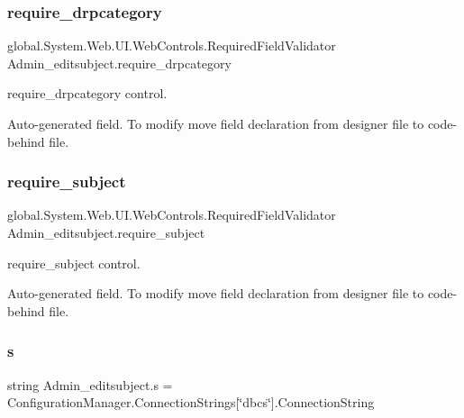 \subsubsection{\texorpdfstring{require\_drpcategory}{require\_drpcategory}}
{\footnotesize\ttfamily global.\+System.\+Web.\+U\+I.\+Web\+Controls.\+Required\+Field\+Validator Admin\+\_\+editsubject.\+require\+\_\+drpcategory\hspace{0.3cm}{\ttfamily [protected]}}



require\+\_\+drpcategory control. 

Auto-\/generated field. To modify move field declaration from designer file to code-\/behind file. \mbox{\label{class_admin__editsubject_a7fb5ee6d2f128bce89d7932269c22a21}} 
\subsubsection{\texorpdfstring{require\_subject}{require\_subject}}
{\footnotesize\ttfamily global.\+System.\+Web.\+U\+I.\+Web\+Controls.\+Required\+Field\+Validator Admin\+\_\+editsubject.\+require\+\_\+subject\hspace{0.3cm}{\ttfamily [protected]}}



require\+\_\+subject control. 

Auto-\/generated field. To modify move field declaration from designer file to code-\/behind file. \mbox{\label{class_admin__editsubject_a594d7e58b6b4cd2b61fff292cd6ae36b}} 
\subsubsection{\texorpdfstring{s}{s}}
{\footnotesize\ttfamily string Admin\+\_\+editsubject.\+s = Configuration\+Manager.\+Connection\+Strings\mbox{[}\char`\"{}dbcs\char`\"{}\mbox{]}.Connection\+String\hspace{0.3cm}{\ttfamily [private]}}

\mbox{\label{class_admin__editsubject_a21358ba782f78c4f975761ab95999883}} 
